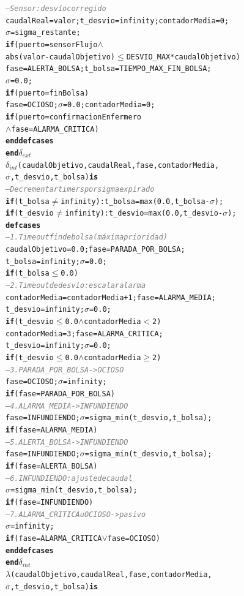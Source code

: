 \documentclass[12pt,a4paper]{article}
\newcommand{\cmlle}{$\leq$}
\newcommand{\cmlgeq}{$\geq$}
\newcommand{\cmllt}{$<$}
\newcommand{\cmlwedge}{$\wedge$}
\newcommand{\cmlneq}{$\neq$}
\newcommand{\cmlvee}{$\vee$}
\newcommand{\kw}[1]{\textbf{#1}}
\newcommand{\cmlsigma}{$\sigma$}
\newcommand{\dint}{$\delta_{\mathit{int}}$}
\newcommand{\dext}{$\delta_{\mathit{ext}}$}
\newcommand{\clambda}{$\lambda$}
\newcommand{\cmlcomment}[1]{\textit{\textcolor{gray}{#1}}}
\newenvironment{cmldevs}{%
  \begin{alltt}\small%
}{%
  \end{alltt}%
}
\begin{document}
\begin{center}
\begin{cmldevs}
        \cmlcomment{-- Sensor: desvío corregido}
        caudalReal = valor; t\_desvio = infinity; contadorMedia = 0;
        \cmlsigma{} = sigma\_restante;
            \kw{if} (puerto = sensorFlujo \cmlwedge{}
            abs(valor - caudalObjetivo) \cmlle{} DESVIO\_MAX * caudalObjetivo)
        fase = ALERTA\_BOLSA; t\_bolsa = TIEMPO\_MAX\_FIN\_BOLSA;
        \cmlsigma{} = 0.0;
            \kw{if} (puerto = finBolsa)
        fase = OCIOSO; \cmlsigma{} = 0.0; contadorMedia = 0;
            \kw{if} (puerto = confirmacionEnfermero
                \cmlwedge{} fase = ALARMA\_CRITICA)
    \kw{end defcases}
\kw{end} \dext{}
\dint{}(caudalObjetivo, caudalReal, fase, contadorMedia,
        \cmlsigma{}, t\_desvio, t\_bolsa) \kw{is}
    \cmlcomment{-- Decrementar timers por sigma expirado}
    \kw{if} (t\_bolsa  \cmlneq{} infinity): t\_bolsa  = max(0.0, t\_bolsa  - \cmlsigma{});
    \kw{if} (t\_desvio \cmlneq{} infinity): t\_desvio = max(0.0, t\_desvio - \cmlsigma{});
    \kw{defcases}
        \cmlcomment{-- 1. Timeout fin de bolsa (máxima prioridad)}
        caudalObjetivo = 0.0; fase = PARADA\_POR\_BOLSA;
        t\_bolsa = infinity; \cmlsigma{} = 0.0;
            \kw{if} (t\_bolsa \cmlle{} 0.0)
        \cmlcomment{-- 2. Timeout de desvío: escalar alarma}
        contadorMedia = contadorMedia + 1; fase = ALARMA\_MEDIA;
        t\_desvio = infinity; \cmlsigma{} = 0.0;
            \kw{if} (t\_desvio \cmlle{} 0.0 \cmlwedge{} contadorMedia \cmllt{} 2)
        contadorMedia = 3; fase = ALARMA\_CRITICA;
        t\_desvio = infinity; \cmlsigma{} = 0.0;
            \kw{if} (t\_desvio \cmlle{} 0.0 \cmlwedge{} contadorMedia \cmlgeq{} 2)
        \cmlcomment{-- 3. PARADA\_POR\_BOLSA -> OCIOSO}
        fase = OCIOSO; \cmlsigma{} = infinity;
            \kw{if} (fase = PARADA\_POR\_BOLSA)
        \cmlcomment{-- 4. ALARMA\_MEDIA -> INFUNDIENDO}
        fase = INFUNDIENDO; \cmlsigma{} = sigma\_min(t\_desvio, t\_bolsa);
            \kw{if} (fase = ALARMA\_MEDIA)
        \cmlcomment{-- 5. ALERTA\_BOLSA -> INFUNDIENDO}
        fase = INFUNDIENDO; \cmlsigma{} = sigma\_min(t\_desvio, t\_bolsa);
            \kw{if} (fase = ALERTA\_BOLSA)
        \cmlcomment{-- 6. INFUNDIENDO: ajuste de caudal}
        \cmlsigma{} = sigma\_min(t\_desvio, t\_bolsa);
            \kw{if} (fase = INFUNDIENDO)
        \cmlcomment{-- 7. ALARMA\_CRITICA u OCIOSO -> pasivo}
        \cmlsigma{} = infinity;
            \kw{if} (fase = ALARMA\_CRITICA \cmlvee{} fase = OCIOSO)
    \kw{end defcases}
\kw{end} \dint{}
\clambda{}(caudalObjetivo, caudalReal, fase, contadorMedia,
           \cmlsigma{}, t\_desvio, t\_bolsa) \kw{is}

\end{cmldevs}
\end{center}
\end{document}
